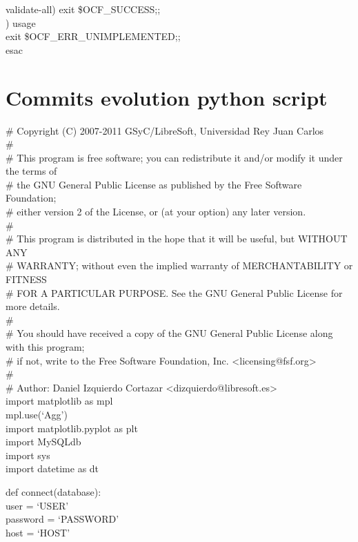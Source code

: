 \documentclass[a4paper, 12pt]{book}
\begin{document}
    \indent validate-all)   exit \$OCF\_SUCCESS;;\\

    \indent *)          usage\\
                \indent \indent exit \$OCF\_ERR\_UNIMPLEMENTED;;\\
esac


\chapter{Commits evolution python script}
\label{app:appendix2}

\# Copyright (C) 2007-2011  GSyC/LibreSoft, Universidad Rey Juan Carlos\\
\#\\
\# This program is free software; you can redistribute it and/or modify it under the terms of \\
\# the GNU General Public License as published by the Free Software Foundation; \\
\# either version 2 of the License, or (at your option) any later version.\\
\#\\
\# This program is distributed in the hope that it will be useful, but WITHOUT ANY \\
\# WARRANTY; without even the implied warranty of MERCHANTABILITY or FITNESS \\
\# FOR A PARTICULAR PURPOSE. See the GNU General Public License for more details.\\
\#\\
\# You should have received a copy of the GNU General Public License along with this program; \\
\# if not, write to the Free Software Foundation, Inc. \textless licensing@fsf.org\textgreater \\
\#\\
\# Author: Daniel Izquierdo Cortazar \textless dizquierdo@libresoft.es\textgreater \\

\noindent import matplotlib as mpl\\
mpl.use(`Agg')\\
import matplotlib.pyplot as plt\\
import MySQLdb\\
import sys\\
import datetime as dt\bigskip

\noindent def connect(database):\\
   \indent user = `USER'\\
   \indent password = `PASSWORD'\\
   \indent host = `HOST'\\
\end{document}
